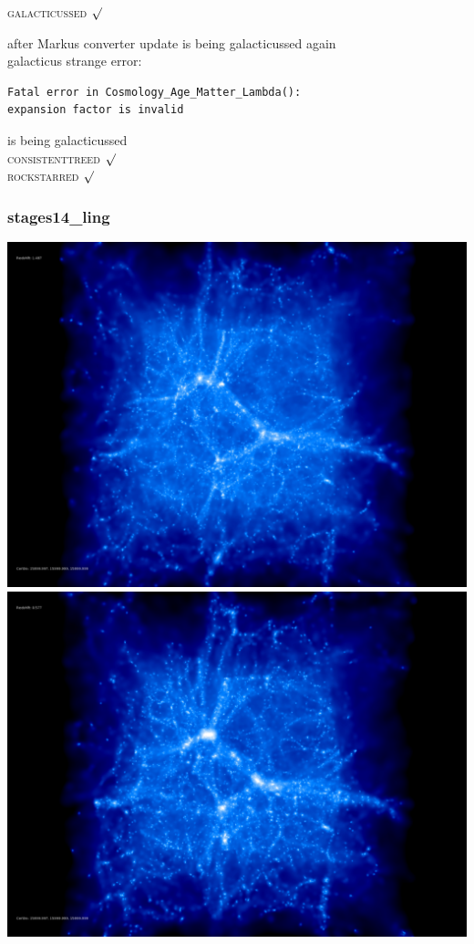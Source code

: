 \textsc{galacticussed} $\surd$

after Markus converter update 
is being galacticussed again \\
galacticus strange error: 
\begin{verbatim}
Fatal error in Cosmology_Age_Matter_Lambda():
expansion factor is invalid
\end{verbatim}
is being galacticussed \\
\textsc{consistenttreed} $\surd$ \\ 
\textsc{rockstarred} $\surd$

% 
%
%
%
%
%
%
%


\newpage
\subsubsection{stages14\_ling}

\includegraphics[scale=0.1]{r256/h100/stages14_ling/50.jpg} 
\includegraphics[scale=0.1]{r256/h100/stages14_ling/100.jpg}  \\

